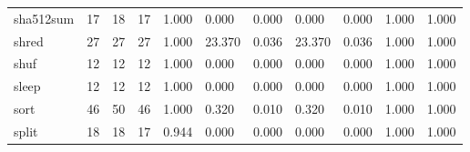 \begin{longtable}{lp{1.8cm}p{1.8cm}p{1.8cm}p{1.8cm}p{1.8cm}p{1.8cm}p{1.8cm}p{1.8cm}p{1.8cm}p{1.8cm}}
sha512sum &                           17 &                 18 &                                17 &                                      1.000 &                                  0.000 &                                        0.000 &                             0.000 &                                   0.000 &                              1.000 &                                              1.000 \\
shred     &                           27 &                 27 &                                27 &                                      1.000 &                                 23.370 &                                        0.036 &                            23.370 &                                   0.036 &                              1.000 &                                              1.000 \\
shuf      &                           12 &                 12 &                                12 &                                      1.000 &                                  0.000 &                                        0.000 &                             0.000 &                                   0.000 &                              1.000 &                                              1.000 \\
sleep     &                           12 &                 12 &                                12 &                                      1.000 &                                  0.000 &                                        0.000 &                             0.000 &                                   0.000 &                              1.000 &                                              1.000 \\
sort      &                           46 &                 50 &                                46 &                                      1.000 &                                  0.320 &                                        0.010 &                             0.320 &                                   0.010 &                              1.000 &                                              1.000 \\
split     &                           18 &                 18 &                                17 &                                      0.944 &                                  0.000 &                                        0.000 &                             0.000 &                                   0.000 &                              1.000 &                                              1.000 \\

\end{longtable}
